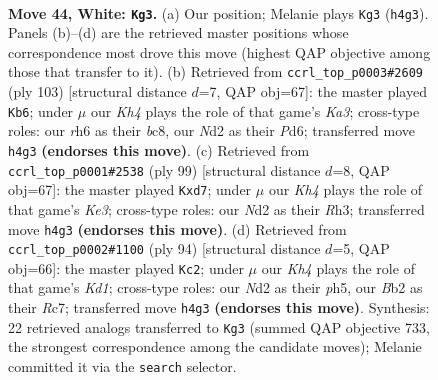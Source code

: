 \documentclass[11pt]{article}
\begin{document}
\clearpage

\begin{figure}[p]\centering
\begin{subfigure}{0.46\textwidth}\centering
\resizebox{\linewidth}{!}{%
\newchessgame
\chessboard[
  setfen={5k2/2P5/7r/8/7K/8/1B1N4/8 w - - 1 44},
  showmover=false,
  pgfstyle=straightmove, color=movearrow, markmove={h4-g3}
]}
\caption{}
\end{subfigure}\hfill
\begin{subfigure}{0.46\textwidth}\centering
\resizebox{\linewidth}{!}{%
\newchessgame
\chessboard[
  setfen={2B5/8/k2p4/8/3p4/8/5K2/3b4 b - - 11 52},
  showmover=false,
  pgfstyle=straightmove, color=movearrow, markmove={a6-b6}
]}
\caption{}
\end{subfigure}
\\[4pt]
\begin{subfigure}{0.46\textwidth}\centering
\resizebox{\linewidth}{!}{%
\newchessgame
\chessboard[
  setfen={8/3P4/2R1k3/8/1b6/7r/1K6/8 b - - 0 50},
  showmover=false,
  pgfstyle=straightmove, color=movearrow, markmove={e6-d7}
]}
\caption{}
\end{subfigure}\hfill
\begin{subfigure}{0.46\textwidth}\centering
\resizebox{\linewidth}{!}{%
\newchessgame
\chessboard[
  setfen={8/2R5/8/P6p/5k2/8/8/1r1K4 w - - 8 48},
  showmover=false,
  pgfstyle=straightmove, color=movearrow, markmove={d1-c2}
]}
\caption{}
\end{subfigure}
\caption{\textbf{Move 44, White: \texttt{Kg3}.} (a) Our position; Melanie plays \texttt{Kg3} (\texttt{h4g3}). Panels (b)--(d) are the retrieved master positions whose correspondence most drove this move (highest QAP objective among those that transfer to it). (b) Retrieved from \texttt{ccrl\_top\_p0003\#2609} (ply 103) [structural distance $d$=7, QAP obj=67]: the master played \texttt{Kb6}; under $\mu$ our \emph{Kh4} plays the role of that game's \emph{Ka3}; cross-type roles: our \emph{r}h6 as their \emph{b}c8, our \emph{N}d2 as their \emph{P}d6; transferred move \texttt{h4g3} \textbf{(endorses this move)}. (c) Retrieved from \texttt{ccrl\_top\_p0001\#2538} (ply 99) [structural distance $d$=8, QAP obj=67]: the master played \texttt{Kxd7}; under $\mu$ our \emph{Kh4} plays the role of that game's \emph{Ke3}; cross-type roles: our \emph{N}d2 as their \emph{R}h3; transferred move \texttt{h4g3} \textbf{(endorses this move)}. (d) Retrieved from \texttt{ccrl\_top\_p0002\#1100} (ply 94) [structural distance $d$=5, QAP obj=66]: the master played \texttt{Kc2}; under $\mu$ our \emph{Kh4} plays the role of that game's \emph{Kd1}; cross-type roles: our \emph{N}d2 as their \emph{p}h5, our \emph{B}b2 as their \emph{R}c7; transferred move \texttt{h4g3} \textbf{(endorses this move)}. Synthesis: 22 retrieved analogs transferred to \texttt{Kg3} (summed QAP objective 733, the strongest correspondence among the candidate moves); Melanie committed it via the \texttt{search} selector.}
\label{fig:thought-m86}
\end{figure}
\end{document}
